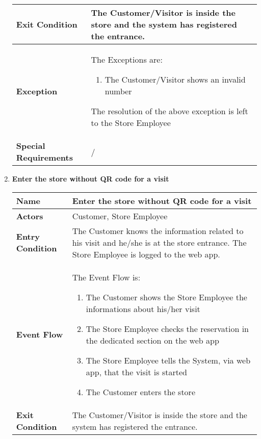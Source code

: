 \begin{enumerate}
{\begin{longtable}{|L{4cm}|L{10cm}|}
                \hline
                \textbf{Exit Condition} & The Customer/Visitor is inside the store and the system has registered the entrance. \\
                \hline
                \textbf{Exception} & The Exceptions are: \begin{enumerate}
                        \item The Customer/Visitor shows an invalid number
                    \end{enumerate} The resolution of the above exception is left to the Store Employee \\
                \hline
                \textbf{Special Requirements} & / \\
                \hline
            \end{longtable}}
            \item \textbf{Enter the store without QR code for a visit}{\renewcommand{\arraystretch}{2}
            \begin{longtable}{|L{4cm}|L{10cm}|}
                \hline
                \textbf{Name} & Enter the store without QR code for a visit \\
                \hline
                \textbf{Actors} & Customer, Store Employee \\
                \hline
                \textbf{Entry Condition} & The Customer knows the information related to his visit and he/she is at the store entrance. The Store Employee is logged to the web app. \\
                \hline
                \textbf{Event Flow} & The Event Flow is: \begin{enumerate}
                        \item The Customer shows the Store Employee the informations about his/her visit
                        \item The Store Employee checks the reservation in the dedicated section on the web app
                        \item The Store Employee tells the System, via web app, that the visit is started
                        \item The Customer enters the store
                    \end{enumerate} \\
                \hline
                \textbf{Exit Condition} & The Customer/Visitor is inside the store and the system has registered the entrance. \\
                \hline

\end{longtable}}
\end{enumerate}
